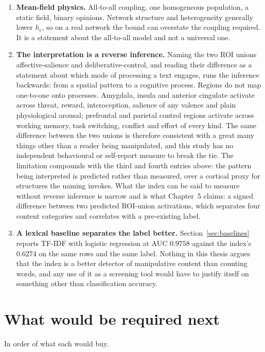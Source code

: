\begin{enumerate}
\item \textbf{Mean-field physics.} All-to-all coupling, one homogeneous population, a static
field, binary opinions. Network structure and heterogeneity generally lower $h_c$, so on a
real network the bound can overstate the coupling required. It is a statement about the
all-to-all model and not a universal one.

\item \textbf{The interpretation is a reverse inference.} Naming the two ROI unions
affective-salience and deliberative-control, and reading their difference as a statement about
which mode of processing a text engages, runs the inference backwards: from a spatial pattern
to a cognitive process. Regions do not map one-to-one onto processes. Amygdala, insula and
anterior cingulate activate across threat, reward, interoception, salience of any valence and
plain physiological arousal; prefrontal and parietal control regions activate across working
memory, task switching, conflict and effort of every kind. The same difference between the two
unions is therefore consistent with a great many things other than a reader being manipulated,
and this study has no independent behavioural or self-report measure to break the tie. The
limitation compounds with the third and fourth entries above: the pattern being interpreted is
predicted rather than measured, over a cortical proxy for structures the naming invokes. What
the index can be said to measure without reverse inference is narrow and is what Chapter~5
claims: a signed difference between two predicted ROI-union activations, which separates four
content categories and correlates with a pre-existing label.

\item \textbf{A lexical baseline separates the label better.} Section~\ref{sec:baselines}
reports TF-IDF with logistic regression at AUC $0.9758$ against the index's $0.6274$ on the
same rows and the same label. Nothing in this thesis argues that the index is a better
detector of manipulative content than counting words, and any use of it as a screening tool
would have to justify itself on something other than classification accuracy.
\end{enumerate}

\section{What would be required next}

In order of what each would buy.


